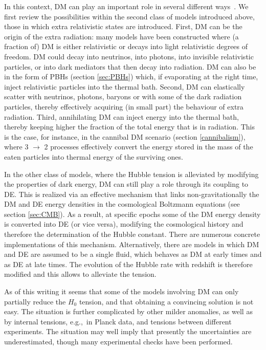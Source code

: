 In this context, DM can play an important role in several different ways~\cite{H0tensionandDM}. We first review the possibilities within the second class of models introduced above, those in which extra relativistic states are introduced. First, DM can be the origin of the extra radiation: many models have been constructed where (a fraction of) DM is either relativistic or
decays into light relativistic degrees of freedom. DM could decay into neutrinos, into photons, into invisible relativistic particles, or into dark mediators that then decay into radiation. DM can also be in the form of PBHs (section \ref{sec:PBHs}) which, if evaporating at the right time, inject relativistic particles into the thermal bath.
Second, DM can elastically scatter with neutrinos, photons, baryons or with some of the dark radiation particles, thereby effectively acquiring (in small part) the behaviour of extra radiation.
Third, annihilating DM can inject energy into the thermal bath, thereby keeping higher the fraction of the total energy that is in radiation.
 This is the case, for instance, in the cannibal DM scenario (section \ref{cannibalism}), where 3 $\to$ 2 processes effectively convert the energy stored in the mass of the eaten particles into thermal energy of the surviving ones.


In the other class of models, where the Hubble tension is alleviated by modifying the properties of dark energy, DM can still play a role through its coupling to DE. This is realized via an effective mechanism that links non-gravitationally the DM and DE energy densities in the cosmological Boltzmann equations (see section \ref{sec:CMB}). As a result, at specific epochs some of the DM energy density is converted into DE (or vice versa), modifying the cosmological history and therefore the determination of the Hubble constant. 
There are numerous concrete implementations of this mechanism.
 Alternatively, there are models in which DM and DE are assumed to be a single fluid, which behaves as DM at early times and as DE at late times. The evolution of the Hubble rate with redshift is therefore modified and this allows to alleviate the tension. 

\smallskip

As of this writing it seems that some of the models involving DM can only partially reduce the $H_0$ tension, 
and that obtaining a convincing solution is not easy. 
The situation is further complicated by other milder anomalies,  
as well as by internal tensions, e.g.,\ in Planck data, 
and tensions between different experiments.
The situation may well imply that 
 presently the uncertainties are underestimated, though many experimental checks have been performed. 



